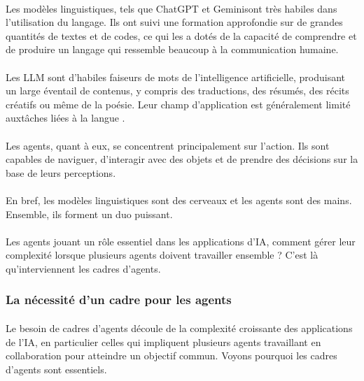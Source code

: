 \paragraph{}
Les modèles linguistiques, tels que ChatGPT et Geminisont très habiles dans l'utilisation du langage. Ils ont suivi une formation approfondie sur de grandes quantités de textes et de codes, ce qui les a dotés de la capacité de comprendre et de produire un langage qui ressemble beaucoup à la communication humaine.

\paragraph{}
Les LLM sont d'habiles faiseurs de mots de l'intelligence artificielle, produisant un large éventail de contenus, y compris des traductions, des résumés, des récits créatifs ou même de la poésie. Leur champ d'application est généralement limité auxtâches liées à la langue .

\paragraph{}
Les agents, quant à eux, se concentrent principalement sur l'action. Ils sont capables de naviguer, d'interagir avec des objets et de prendre des décisions sur la base de leurs perceptions. 

\paragraph{}
En bref, les modèles linguistiques sont des cerveaux et les agents sont des mains. Ensemble, ils forment un duo puissant.

\paragraph{}
Les agents jouant un rôle essentiel dans les applications d'IA, comment gérer leur complexité lorsque plusieurs agents doivent travailler ensemble ? C'est là qu'interviennent les cadres d'agents.

\subsubsection{La nécessité d'un cadre pour les agents }

\paragraph{}
Le besoin de cadres d'agents découle de la complexité croissante des applications de l'IA, en particulier celles qui impliquent plusieurs agents travaillant en collaboration pour atteindre un objectif commun. Voyons pourquoi les cadres d'agents sont essentiels.   

